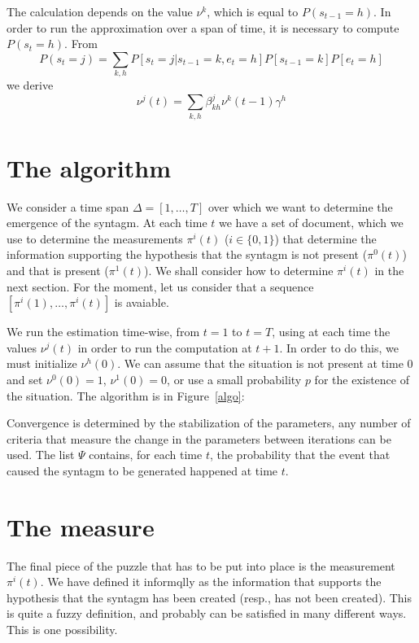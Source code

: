 \documentclass[10pt]{article}
\def\st{s}
\def\ev{e}
\begin{document}
The calculation depends on the value $\nu^k$, which is equal to
$P(\st_{t-1}=h)$. In order to run the approximation over a span of
time, it is necessary to compute $P(\st_t=h)$. From 
%
%
\begin{equation}
  P(\st_t=j) = \sum_{k,h} P[\st_t=j|\st_{t-1}=k,\ev_t=h] P[\st_{t-1}=k] P[\ev_t=h]
\end{equation}
%
%
we derive
%
%
\begin{equation}
  \nu^j(t) = \sum_{k,h} \beta_{kh}^j \nu^k(t-1) \gamma^h
\end{equation}
%
%



\section{The algorithm}
We consider a time span $\Delta=[1,\ldots,T]$ over which we want to
determine the emergence of the syntagm. At each time $t$ we have a set
of document, which we use to determine the measurements $\pi^i(t)$
($i\in\{0,1\}$) that determine the information supporting the
hypothesis that the syntagm is not present ($\pi^0(t)$) and that is
present ($\pi^1(t)$). We shall consider how to determine $\pi^i(t)$ in
the next section. For the moment, let us consider that a sequence
$[\pi^i(1),\ldots,\pi^i(t)]$ is avaiable. 

We run the estimation time-wise, from $t=1$ to $t=T$, using at each
time the values $\nu^j(t)$ in order to run the computation at
$t+1$. In order to do this, we must initialize $\nu^h(0)$. We can
assume that the situation is not present at time $0$ and set
$\nu^0(0)=1$, $\nu^1(0)=0$, or use a small probability $p$ for the
existence of the situation. The algorithm is in Figure~\ref{algo}:


Convergence is determined by the stabilization of the parameters, any
number of criteria that measure the change in the parameters between
iterations can be used. The list $\Psi$ contains, for each time $t$,
the probability that the event that caused the syntagm to be generated
happened at time $t$.

\section{The measure}
The final piece of the puzzle that has to be put into place is the
measurement $\pi^i(t)$. We have defined it informqlly as the
information that supports the hypothesis that the syntagm has been
created (resp., has not been created). This is quite a fuzzy
definition, and probably can be satisfied in many different ways. This
is one possibility.
\end{document}
